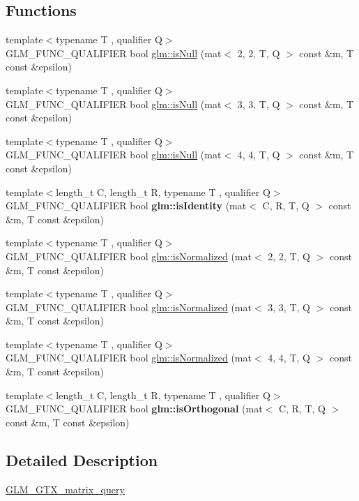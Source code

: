 \subsection*{Functions}
\begin{DoxyCompactItemize}
\item 
{\footnotesize template$<$typename T , qualifier Q$>$ }\\G\+L\+M\+\_\+\+F\+U\+N\+C\+\_\+\+Q\+U\+A\+L\+I\+F\+I\+ER bool \hyperlink{group__gtx__matrix__query_ga9790ec222ce948c0ff0d8ce927340dba}{glm\+::is\+Null} (mat$<$ 2, 2, T, Q $>$ const \&m, T const \&epsilon)
\item 
{\footnotesize template$<$typename T , qualifier Q$>$ }\\G\+L\+M\+\_\+\+F\+U\+N\+C\+\_\+\+Q\+U\+A\+L\+I\+F\+I\+ER bool \hyperlink{group__gtx__matrix__query_gae14501c6b14ccda6014cc5350080103d}{glm\+::is\+Null} (mat$<$ 3, 3, T, Q $>$ const \&m, T const \&epsilon)
\item 
{\footnotesize template$<$typename T , qualifier Q$>$ }\\G\+L\+M\+\_\+\+F\+U\+N\+C\+\_\+\+Q\+U\+A\+L\+I\+F\+I\+ER bool \hyperlink{group__gtx__matrix__query_ga2b98bb30a9fefa7cdea5f1dcddba677b}{glm\+::is\+Null} (mat$<$ 4, 4, T, Q $>$ const \&m, T const \&epsilon)
\item 
\mbox{\label{matrix__query_8inl_a8dc1b6d068dde72568fc1fcfa2238ca5}} 
{\footnotesize template$<$length\+\_\+t C, length\+\_\+t R, typename T , qualifier Q$>$ }\\G\+L\+M\+\_\+\+F\+U\+N\+C\+\_\+\+Q\+U\+A\+L\+I\+F\+I\+ER bool {\bfseries glm\+::is\+Identity} (mat$<$ C, R, T, Q $>$ const \&m, T const \&epsilon)
\item 
{\footnotesize template$<$typename T , qualifier Q$>$ }\\G\+L\+M\+\_\+\+F\+U\+N\+C\+\_\+\+Q\+U\+A\+L\+I\+F\+I\+ER bool \hyperlink{group__gtx__matrix__query_gae785af56f47ce220a1609f7f84aa077a}{glm\+::is\+Normalized} (mat$<$ 2, 2, T, Q $>$ const \&m, T const \&epsilon)
\item 
{\footnotesize template$<$typename T , qualifier Q$>$ }\\G\+L\+M\+\_\+\+F\+U\+N\+C\+\_\+\+Q\+U\+A\+L\+I\+F\+I\+ER bool \hyperlink{group__gtx__matrix__query_gaa068311695f28f5f555f5f746a6a66fb}{glm\+::is\+Normalized} (mat$<$ 3, 3, T, Q $>$ const \&m, T const \&epsilon)
\item 
{\footnotesize template$<$typename T , qualifier Q$>$ }\\G\+L\+M\+\_\+\+F\+U\+N\+C\+\_\+\+Q\+U\+A\+L\+I\+F\+I\+ER bool \hyperlink{group__gtx__matrix__query_ga4d9bb4d0465df49fedfad79adc6ce4ad}{glm\+::is\+Normalized} (mat$<$ 4, 4, T, Q $>$ const \&m, T const \&epsilon)
\item 
\mbox{\label{matrix__query_8inl_a4a14310285b0b47cd8357b63e3be0352}} 
{\footnotesize template$<$length\+\_\+t C, length\+\_\+t R, typename T , qualifier Q$>$ }\\G\+L\+M\+\_\+\+F\+U\+N\+C\+\_\+\+Q\+U\+A\+L\+I\+F\+I\+ER bool {\bfseries glm\+::is\+Orthogonal} (mat$<$ C, R, T, Q $>$ const \&m, T const \&epsilon)
\end{DoxyCompactItemize}


\subsection{Detailed Description}
\hyperlink{group__gtx__matrix__query}{G\+L\+M\+\_\+\+G\+T\+X\+\_\+matrix\+\_\+query} 